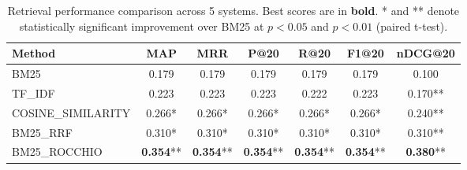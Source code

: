 \begin{table}[t]
\centering
\caption{Retrieval performance comparison across 5 systems. Best scores are in \textbf{bold}. * and ** denote statistically significant improvement over BM25 at $p<0.05$ and $p<0.01$ (paired t-test).}
\label{tab:results}
\small
\begin{tabular}{lcccccc}
\toprule
\textbf{Method} & \textbf{MAP} & \textbf{MRR} & \textbf{P@20} & \textbf{R@20} & \textbf{F1@20} & \textbf{nDCG@20} \\
\midrule
BM25 & 0.179 & 0.179 & 0.179 & 0.179 & 0.179 & 0.100 \\
TF\_IDF & 0.223 & 0.223 & 0.223 & 0.222 & 0.223 & 0.170** \\
COSINE\_SIMILARITY & 0.266* & 0.266* & 0.266* & 0.266* & 0.266* & 0.240** \\
BM25\_RRF & 0.310* & 0.310* & 0.310* & 0.310* & 0.310* & 0.310** \\
BM25\_ROCCHIO & \textbf{0.354}** & \textbf{0.354}** & \textbf{0.354}** & \textbf{0.354}** & \textbf{0.354}** & \textbf{0.380}** \\
\bottomrule
\end{tabular}
\end{table}